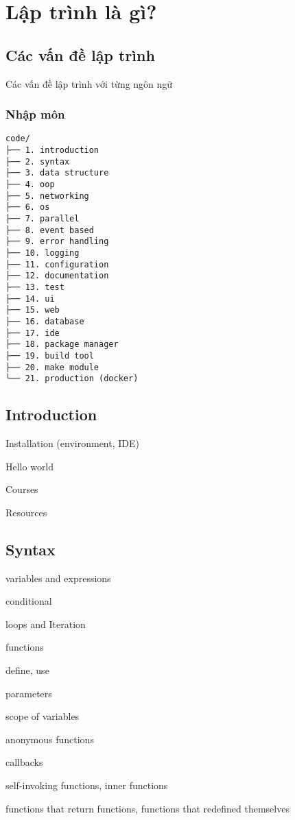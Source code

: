 \chapter{Lập trình là gì?}

\section{Các vấn đề lập trình}

Các vấn đề lập trình với từng ngôn ngữ

\subsection{Nhập môn}

\begin{lstlisting}
code/
├── 1. introduction
├── 2. syntax
├── 3. data structure
├── 4. oop
├── 5. networking
├── 6. os
├── 7. parallel
├── 8. event based
├── 9. error handling
├── 10. logging
├── 11. configuration
├── 12. documentation
├── 13. test
├── 14. ui
├── 15. web
├── 16. database
├── 17. ide
├── 18. package manager
├── 19. build tool
├── 20. make module
└── 21. production (docker)
\end{lstlisting}

\section{Introduction}

Installation (environment, IDE)

Hello world

Courses

Resources


\section{Syntax}

variables and expressions

conditional

loops and Iteration

functions

define, use

parameters

scope of variables

anonymous functions

callbacks

self-invoking functions, inner functions

functions that return functions, functions that redefined themselves

